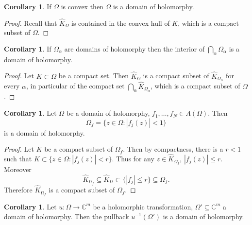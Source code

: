 \documentclass[12pt]{report}
\newcommand{\CC}{\mathbb{C}}
\theoremstyle{definition}
\newtheorem{corollary}[theorem]{Corollary}
\begin{document}
\begin{corollary}
    If $\Omega$ is convex then $\Omega$ is a domain of holomorphy.
\end{corollary}
\begin{proof}
    Recall that $\hat K_\Omega$ is contained in the convex hull of $K$, which is a compact subset of $\Omega$.
\end{proof}
\begin{corollary}
    If $\Omega_\alpha$ are domains of holomorphy then the interior of $\bigcap_\alpha \Omega_\alpha$ is a domain of holomorphy.
\end{corollary}
\begin{proof}
    Let $K \subset \Omega$ be a compact set. Then $\hat K_\Omega$ is a compact subset of $\hat K_{\Omega_\alpha}$ for every $\alpha$, in particular of the compact set $\bigcap_\alpha \hat K_{\Omega_\alpha}$, which is a compact subset of $\Omega$.
\end{proof}
\begin{corollary}
    Let $\Omega$ be a domain of holomorphy, $f_1, \dots, f_N \in A(\Omega)$. Then
    $$\Omega_f = \{z \in \Omega: |f_j(z)| < 1\}$$
    is a domain of holomorphy.
\end{corollary}
\begin{proof}
    Let $K$ be a compact subset of $\Omega_f$. Then by compactness, there is a $r < 1$ such that $K \subset \{z \in \Omega: |f_j(z)| < r\}$. Thus for any $z \in \hat K_{\Omega_f}$, $|f_j(z)| \leq r$. Moreover
    $$\hat K_{\Omega_f} \subseteq \hat K_\Omega \subset \{|f_j| \leq r\} \subseteq \Omega_f.$$
    Therefore $\hat K_{\Omega_f}$ is a compact subset of $\Omega_f$. 
\end{proof}
\begin{corollary}
    Let $u: \Omega \to \CC^m$ be a holomorphic transformation, $\Omega' \subseteq \CC^m$ a domain of holomorphy. Then the pullback $u^{-1}(\Omega')$ is a domain of holomorphy.
\end{corollary}
\end{document}
